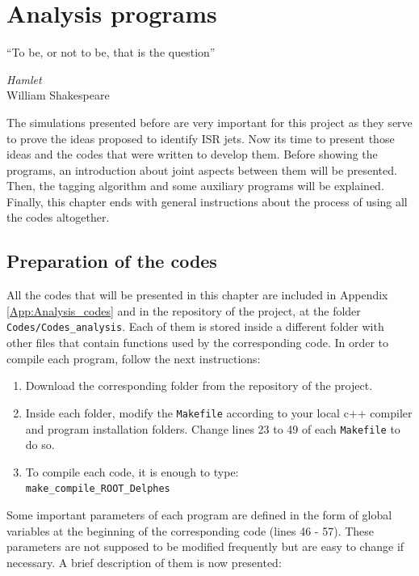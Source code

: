 \documentclass[12pt, oneside]{book}              %
\begin{document}
\chapter{Analysis programs}\label{cha:Analysis_codes}

\epigraph{\textquotedblleft To be, or not to be, that is the question\textquotedblright}{\textit{Hamlet} \\ William Shakespeare}

The simulations presented before are very important for this project 
as they serve to prove the ideas proposed to identify ISR jets. 
Now its time to present those ideas and the codes that were written
to develop them. Before showing the programs, an introduction 
about joint aspects between them will be presented. Then, the
tagging algorithm and some auxiliary programs will be explained.
Finally, this chapter ends with general instructions about the
process of using all the codes altogether.

\section[Preparation of the codes]{Preparation of the codes} \label{sec:Preparation_codes}

All the codes that will be presented in this chapter are included in Appendix \ref{App:Analysis_codes}
and in the repository of the project, at the folder \texttt{Codes/Codes\_analysis}.
Each of them is stored inside a different folder with other files that contain
functions used by the corresponding code. In order to compile each program, follow 
the next instructions:

\begin{enumerate}
\item Download the corresponding folder from the repository of the project.
\item Inside each folder, modify the \texttt{Makefile} according to your local
c++ compiler and program installation folders. Change lines 23 to 49 of each 
\texttt{Makefile} to do so.
\item To compile each code, it is enough to type:
\\ \texttt{make\_compile\_ROOT\_Delphes}
\end{enumerate}

Some important parameters of each program are defined in the form of global variables 
at the beginning of the corresponding code (lines 46 - 57). These parameters 
are not supposed to be modified frequently but are easy to change if necessary. A brief
description of them is now presented:
\end{document}
